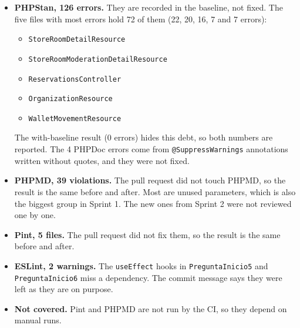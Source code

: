 \begin{itemize}[nosep]
  \item \textbf{PHPStan, 126 errors.}
        They are recorded in the baseline, not fixed.
        The five files with most errors hold 72 of them (22, 20, 16, 7 and 7 errors):
        \begin{itemize}[nosep]
          \item \texttt{StoreRoomDetailResource}
          \item \texttt{StoreRoomModerationDetailResource}
          \item \texttt{ReservationsController}
          \item \texttt{OrganizationResource}
          \item \texttt{WalletMovementResource}
        \end{itemize}
        The with-baseline result (0 errors) hides this debt, so both numbers are reported.
        The 4 PHPDoc errors come from \texttt{@SuppressWarnings} annotations written without quotes, and they were not fixed.
  \item \textbf{PHPMD, 39 violations.}
        The pull request did not touch PHPMD, so the result is the same before and after.
        Most are unused parameters, which is also the biggest group in Sprint 1.
        The new ones from Sprint 2 were not reviewed one by one.
  \item \textbf{Pint, 5 files.}
        The pull request did not fix them, so the result is the same before and after.
  \item \textbf{ESLint, 2 warnings.}
        The \texttt{useEffect} hooks in \texttt{PreguntaInicio5} and \texttt{PreguntaInicio6} miss a dependency.
        The commit message says they were left as they are on purpose.
  \item \textbf{Not covered.}
        Pint and PHPMD are not run by the CI, so they depend on manual runs.
\end{itemize}
